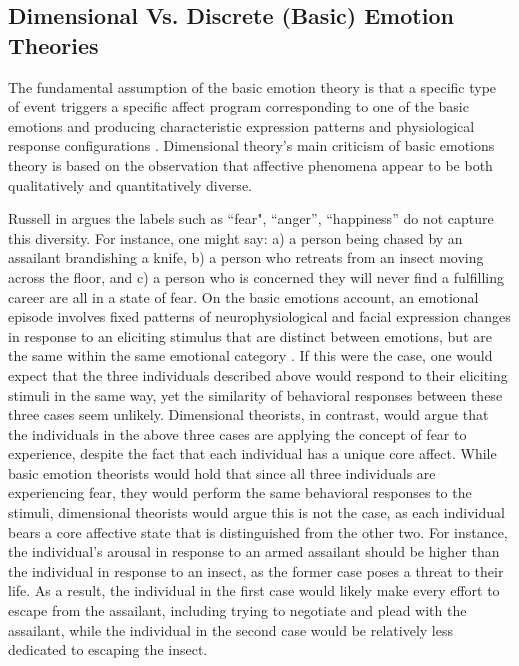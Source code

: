\documentclass[11pt]{article}
\begin{document}
\subsection{Dimensional Vs. Discrete (Basic) Emotion Theories}

The fundamental assumption of the basic emotion theory is that a specific type
of event triggers a specific affect program corresponding to one of the basic
emotions and producing characteristic expression patterns and physiological
response configurations \cite{scherer:emotions-emergent}. Dimensional theory's
main criticism of basic emotions theory is based on the observation that
affective phenomena appear to be both qualitatively and quantitatively diverse.

Russell in \cite{russell:core-affect} argues the labels such as ``fear",
``anger'', ``happiness'' do not capture this diversity. For instance, one might
say: a) a person being chased by an assailant brandishing a knife, b) a person
who retreats from an insect moving across the floor, and c) a person who is
concerned they will never find a fulfilling career are all in a state of
fear. On the basic emotions account, an emotional episode involves fixed
patterns of neurophysiological and facial expression changes in response to an
eliciting stimulus that are distinct between emotions, but are the same within
the same emotional category \cite{ekman:argument-emotions}. If this were the
case, one would expect that the three individuals described above would respond
to their eliciting stimuli in the same way, yet the similarity of behavioral
responses between these three cases seem unlikely. Dimensional theorists, in
contrast, would argue that the individuals in the above three cases are applying
the concept of fear to experience, despite the fact that each individual has a
unique core affect. While basic emotion theorists would hold that since all
three individuals are experiencing fear, they would perform the same behavioral
responses to the stimuli, dimensional theorists would argue this is not the
case, as each individual bears a core affective state that is distinguished from
the other two. For instance, the individual's arousal in response to an armed
assailant should be higher than the individual in response to an insect, as the
former case poses a threat to their life. As a result, the individual in the
first case would likely make every effort to escape from the assailant,
including trying to negotiate and plead with the assailant, while the individual
in the second case would be relatively less dedicated to escaping the insect. 
\end{document}
